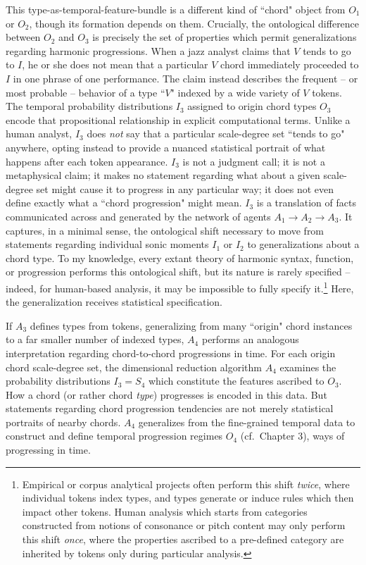 This type-as-temporal-feature-bundle is a different kind of ``chord" object from $O_1$ or $O_2$, though its formation depends on them.  Crucially, the ontological difference between $O_2$ and $O_3$ is precisely the set of properties which permit generalizations regarding harmonic progressions.  When a jazz analyst claims that $V$ tends to go to $I$, he or she does not mean that a particular $V$ chord immediately proceeded to $I$ in one phrase of one performance.  The claim instead describes the frequent -- or most probable -- behavior of a type ``$V$" indexed by a wide variety of $V$ tokens.  The temporal probability distributions $I_3$ assigned to origin chord types $O_3$ encode that propositional relationship in explicit computational terms.  Unlike a human analyst, $I_3$ does \emph{not} say that a particular scale-degree set ``tends to go" anywhere, opting instead to provide a nuanced statistical portrait of what happens after each token appearance.  $I_3$ is not a judgment call; it is not a metaphysical claim; it makes no statement regarding what about a given scale-degree set might cause it to progress in any particular way; it does not even define exactly what a ``chord progression" might mean.  $I_3$ is a translation of facts communicated across and generated by the network of agents $A_1 \rightarrow A_2 \rightarrow A_3$.  It captures, in a minimal sense, the ontological shift necessary to move from statements regarding individual sonic moments $I_1$ or $I_2$ to generalizations about a chord type.  To my knowledge, every extant theory of harmonic syntax, function, or progression performs this ontological shift, but its nature is rarely specified -- indeed, for human-based analysis, it may be impossible to fully specify it.\footnote{Empirical or corpus analytical projects often perform this shift \emph{twice}, where individual tokens index types, and types generate or induce rules which then impact other tokens.  Human analysis which starts from categories constructed from notions of consonance or pitch content may only perform this shift \emph{once}, where the properties ascribed to a pre-defined category are inherited by tokens only during particular analysis.}  Here, the generalization receives statistical specification.

If $A_3$ defines types from tokens, generalizing from many ``origin" chord instances to a far smaller number of indexed types, $A_4$ performs an analogous interpretation regarding chord-to-chord progressions in time.  For each origin chord scale-degree set, the dimensional reduction algorithm $A_4$ examines the probability distributions $I_3 = S_4$ which constitute the features ascribed to $O_3$.  How a chord (or rather chord \emph{type}) progresses is encoded in this data.  But statements regarding chord progression tendencies are not merely statistical portraits of nearby chords.  $A_4$ generalizes from the fine-grained temporal data to construct and define temporal progression regimes $O_4$ (cf.\ Chapter 3), ways of progressing in time.

